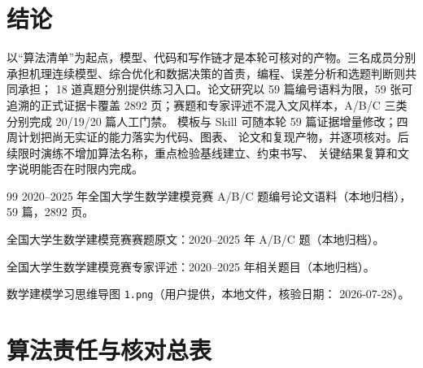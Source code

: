 \documentclass[UTF8,a4paper,12pt]{ctexart}
\begin{document}
\section{结论}

以“算法清单”为起点，模型、代码和写作链才是本轮可核对的产物。三名成员分别
承担机理连续模型、综合优化和数据决策的首责，编程、误差分析和选题判断则共同承担；
18 道真题分别提供练习入口。论文研究以 59 篇编号语料为限，59 张可追溯的正式证据卡覆盖
2892 页；赛题和专家评述不混入文风样本，A/B/C 三类分别完成 20/19/20 篇人工门禁。
模板与 Skill 可随本轮 59 篇证据增量修改；四周计划把尚无实证的能力落实为代码、图表、
论文和复现产物，并逐项核对。后续限时演练不增加算法名称，重点检验基线建立、约束书写、
关键结果复算和文字说明能否在时限内完成。

\begin{thebibliography}{99}
2020--2025 年全国大学生数学建模竞赛 A/B/C 题编号论文语料（本地归档），
59 篇，2892 页。

全国大学生数学建模竞赛赛题原文：2020--2025 年 A/B/C 题（本地归档）。

全国大学生数学建模竞赛专家评述：2020--2025 年相关题目（本地归档）。

数学建模学习思维导图 \texttt{1.png}（用户提供，本地文件，核验日期：
2026-07-28）。
\end{thebibliography}

\appendix
\section{算法责任与核对总表}
\end{document}
